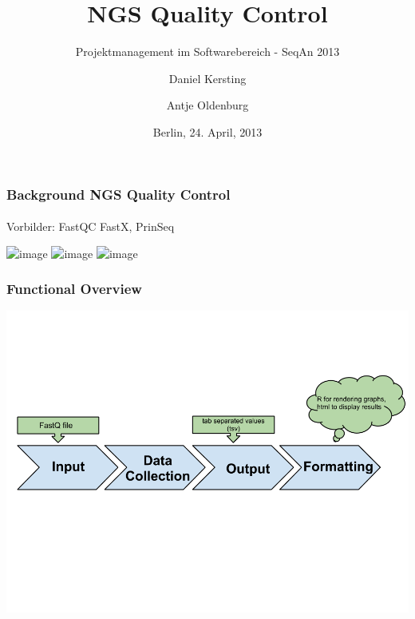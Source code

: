 \documentclass{beamer}
\begin{document}
\title{NGS Quality Control}
\subtitle{Projektmanagement im Softwarebereich - SeqAn 2013}
\author{Daniel Kersting \and Antje Oldenburg}
\date{Berlin, 24. April, 2013}
\subject{Informatik}


\frame{\titlepage}

\begin{frame}
  \frametitle{Background NGS Quality Control}
  \framesubtitle{}
   Vorbilder: FastQC FastX, PrinSeq\pause
  \begin{center}
  \includegraphics<2>[width=0.65\textwidth, angle=0]{fastqc.png}\pause
  \includegraphics<3>[width=0.65\textwidth, angle=0]{FastX.png}\pause
  \includegraphics<4>[width=0.65\textwidth, angle=0]{PrinSeq.png}
  \end{center}
\end{frame}

\begin{frame}


  \frametitle{Functional Overview}
  \begin{center}
  \includegraphics[width=1\textwidth, angle=0]{Flussdiagramm.png}
  \end{center}

\end{frame}
\end{document}

